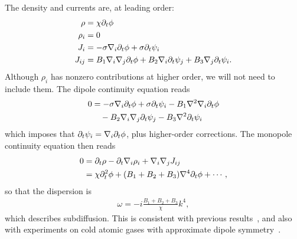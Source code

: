 The density and currents are, at leading order:
\begin{align}
\rho &= \chi\partial_t \phi \nonumber\\
\rho_i &= 0\nonumber\\
J_i &= - \sigma \nabla_i \partial_t\phi + \sigma \partial_t\psi_i \nonumber\\
J_{ij} &= B_1 \nabla_i\nabla_j \partial_t \phi + B_2 \nabla_i \partial_t \psi_j + B_3 \nabla_j \partial_t \psi_i.
\end{align}
Although $\rho_i$ has nonzero contributions at higher order, we will not need to include them. The dipole continuity equation reads
\begin{align}
0 &= - \sigma \nabla_i \partial_t\phi + \sigma \partial_t\psi_i - B_1 \nabla^2\nabla_i \partial_t \phi  \nonumber\\
&\quad - B_2 \nabla_i\nabla_j \partial_t \psi_j - B_3 \nabla^2 \partial_t \psi_i
\end{align}
which imposes that $\partial_t\psi_i = \nabla_i \partial_t\phi$, plus higher-order corrections. The monopole continuity equation then reads
\begin{align}
0 &= \partial_t \rho -\partial_t \nabla_i \rho_i + \nabla_i\nabla_j J_{ij} \nonumber\\
&= \chi\partial_t^2 \phi + (B_1 + B_2 + B_3)\nabla^4 \partial_t \phi + \cdots,
\end{align}
so that the dispersion is
\begin{align}
\omega = -i \frac{B_1 + B_2 + B_3}{\chi}k^4,
\end{align}
which describes subdiffusion. This is consistent with previous results~\cite{Gromov2020Fracton}, and also with experiments on cold atomic gases with approximate dipole symmetry~\cite{GuardadoSanchez2020}. 


